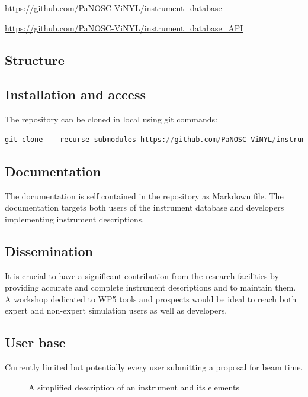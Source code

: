 \documentclass[11pt, a4paper]{article}
\begin{document}
\href{https://github.com/PaNOSC-ViNYL/instrument_database}{https://github.com/PaNOSC-ViNYL/instrument\_database}


\href{https://github.com/PaNOSC-ViNYL/instrument_database_API}{https://github.com/PaNOSC-ViNYL/instrument\_database\_API}

\subsection{Structure}

\subsection{Installation and access}
The repository can be cloned in local using git commands:
\begin{lstlisting}[language=Python]
git clone  --recurse-submodules https://github.com/PaNOSC-ViNYL/instrument_database.git
\end{lstlisting}


\subsection{Documentation}
The documentation is self contained in the repository as Markdown file. 
The documentation targets both users of the instrument database and developers implementing instrument descriptions.

\subsection{Dissemination}
It is crucial to have a significant contribution from the research facilities by providing accurate and complete instrument descriptions and to maintain them.
A workshop dedicated to WP5 tools and prospects would be ideal to reach both expert and non-expert simulation users as well as developers.

\subsection{User base}
Currently limited but potentially every user submitting a proposal for beam time.
\begin{figure}[tp]
\caption{A simplified description of an instrument and its elements}
\label{fig:instrument_diagram}
\end{figure}
\end{document}
